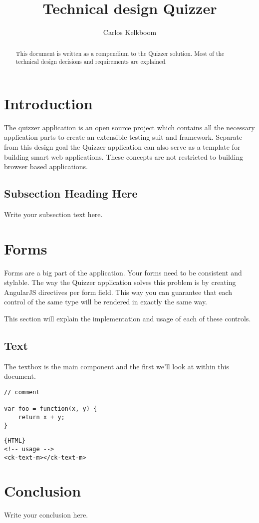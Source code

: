 \documentclass{article}
\begin{document}
\title{Technical design Quizzer}
\author{Carlos Kelkboom}

\maketitle

\begin{abstract}
This document is written as a compendium to the Quizzer solution. Most of the technical design decisions and requirements are explained.
\end{abstract}

\section{Introduction}
The quizzer application is an open source project which contains all the necessary application parts to create an extensible testing suit and framework. Separate from this design goal the Quizzer application can also serve as a template for building smart web applications. These concepts are not restricted to building browser based applications. 


\subsection{Subsection Heading Here}
Write your subsection text here.


\section{Forms}
Forms are a big part of the application. Your forms need to be consistent and stylable. The way the Quizzer application solves this problem is by creating AngularJS directives per form field. This way you can guarantee that each control of the same type will be rendered in exactly the same way.

This section will explain the implementation and usage of each of these controls.

\subsection{Text}
The textbox is the main component and the first we’ll look at within this document.

\begin{lstlisting}
// comment

var foo = function(x, y) {
    return x + y;
}
\end{lstlisting}

\begin{lstlisting}{HTML}
<!-- usage -->
<ck-text-m></ck-text-m>
\end{lstlisting}


\section{Conclusion}
Write your conclusion here.
\end{document}
